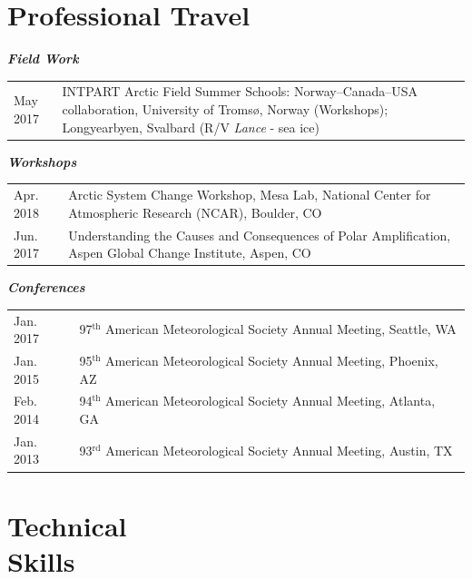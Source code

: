\documentclass[margin,line,palatino,courier,10pt]{res}
\begin{document}
\begin{resume}
\section{\sc \textcolor{Cerulean}{\large{\textbf{Professional Travel}}}}
\textit{\textbf{Field Work}}
\vspace*{0.05in}\\
\begin{tabular}{@{}p{0.9in}p{4in}}
May 2017 & INTPART Arctic Field Summer Schools: Norway--Canada--USA collaboration, University of Troms\o, Norway (Workshops); Longyearbyen, Svalbard (R/V \textit{Lance} - sea ice)
\end{tabular}

\textit{\textbf{Workshops}}
\vspace*{0.05in}\\
\begin{tabular}{@{}p{0.9in}p{4in}}
Apr. 2018 & Arctic System Change Workshop, Mesa Lab, National Center for Atmospheric Research (NCAR), Boulder, CO\\
Jun. 2017 & Understanding the Causes and Consequences of Polar Amplification, Aspen Global Change Institute, Aspen, CO
\end{tabular}
\newpage
\textit{\textbf{Conferences}}
\vspace*{0.05in}\\
\begin{tabular}{@{}p{0.9in}p{4in}}
Jan. 2017 & 97$^\text{th} $ American Meteorological Society Annual Meeting, Seattle, WA \\
Jan. 2015 & 95$^\text{th} $ American Meteorological Society Annual Meeting, Phoenix, AZ \\
Feb. 2014 & 94$^\text{th} $ American Meteorological Society Annual Meeting, Atlanta, GA \\
Jan. 2013 & 93$^\text{rd} $ American Meteorological Society Annual Meeting, Austin, TX \\
\end{tabular}

\section{\sc \textcolor{Cerulean}{\large{\textbf{Technical \\ Skills}}}}
\vspace*{0.05in}
\begin{tabular}{@{}p{0.9in}p{6in}}


\end{tabular}
\end{resume}
\end{document}
